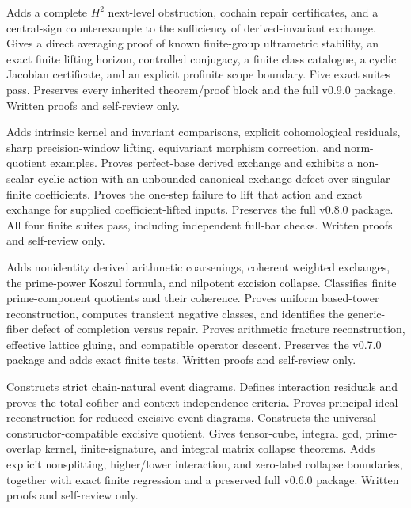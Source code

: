 \documentclass[11pt]{article}
\theoremstyle{definition}
\theoremstyle{remark}
\begin{document}
\begingroup\footnotesize\raggedright
\begin{description}[leftmargin=8em,style=nextline]
\item[v0.10.0] Adds a complete $H^2$ next-level obstruction, cochain repair certificates, and a central-sign counterexample to the sufficiency of derived-invariant exchange. Gives a direct averaging proof of known finite-group ultrametric stability, an exact finite lifting horizon, controlled conjugacy, a finite class catalogue, a cyclic Jacobian certificate, and an explicit profinite scope boundary. Five exact suites pass. Preserves every inherited theorem/proof block and the full v0.9.0 package. Written proofs and self-review only.
\item[v0.9.0] Adds intrinsic kernel and invariant comparisons, explicit cohomological residuals, sharp precision-window lifting, equivariant morphism correction, and norm-quotient examples. Proves perfect-base derived exchange and exhibits a non-scalar cyclic action with an unbounded canonical exchange defect over singular finite coefficients. Proves the one-step failure to lift that action and exact exchange for supplied coefficient-lifted inputs. Preserves the full v0.8.0 package. All four finite suites pass, including independent full-bar checks. Written proofs and self-review only.
\item[v0.8.0] Adds nonidentity derived arithmetic coarsenings, coherent weighted exchanges, the prime-power Koszul formula, and nilpotent excision collapse. Classifies finite prime-component quotients and their coherence. Proves uniform based-tower reconstruction, computes transient negative classes, and identifies the generic-fiber defect of completion versus repair. Proves arithmetic fracture reconstruction, effective lattice gluing, and compatible operator descent. Preserves the v0.7.0 package and adds exact finite tests. Written proofs and self-review only.
\item[v0.7.0] Constructs strict chain-natural event diagrams. Defines interaction residuals and proves the total-cofiber and context-independence criteria. Proves principal-ideal reconstruction for reduced excisive event diagrams. Constructs the universal constructor-compatible excisive quotient. Gives tensor-cube, integral gcd, prime-overlap kernel, finite-signature, and integral matrix collapse theorems. Adds explicit nonsplitting, higher/lower interaction, and zero-label collapse boundaries, together with exact finite regression and a preserved full v0.6.0 package. Written proofs and self-review only.

\end{description}
\end{document}
